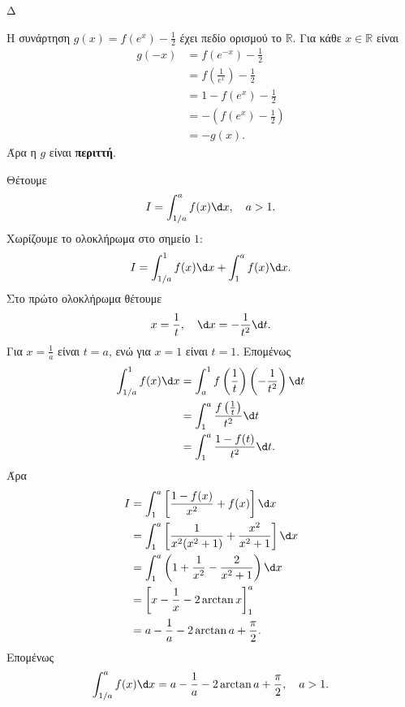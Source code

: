 \begin{thema}{Δ}
\begin{erwthma}
Η συνάρτηση $g(x)=f(e^x)-\frac{1}{2}$ έχει πεδίο ορισμού το $\mathbb{R}$. Για κάθε $x\in\mathbb{R}$ είναι
\begin{align*}
g(-x)
&=f(e^{-x})-\frac{1}{2}\\
&=f\left(\frac{1}{e^x}\right)-\frac{1}{2}\\
&=1-f(e^x)-\frac{1}{2}\\
&=-\left(f(e^x)-\frac{1}{2}\right)\\
&=-g(x).
\end{align*}
Άρα η $g$ είναι \textbf{περιττή}.

\item Θέτουμε
\[
I=\int_{1/a}^{a}f(x)\d x,\quad a>1.
\]
Χωρίζουμε το ολοκλήρωμα στο σημείο $1$:
\[
I=\int_{1/a}^{1}f(x)\d x+\int_1^a f(x)\d x.
\]
Στο πρώτο ολοκλήρωμα θέτουμε
\[
x=\frac{1}{t},
\quad
\d x=-\frac{1}{t^2}\d t.
\]
Για $x=\frac{1}{a}$ είναι $t=a$, ενώ για $x=1$ είναι $t=1$. Επομένως
\begin{align*}
\int_{1/a}^{1}f(x)\d x
&=\int_a^1 f\left(\frac{1}{t}\right)\left(-\frac{1}{t^2}\right)\d t\\
&=\int_1^a\frac{f\left(\frac{1}{t}\right)}{t^2}\d t\\
&=\int_1^a\frac{1-f(t)}{t^2}\d t.
\end{align*}
Άρα
\begin{align*}
I
&=\int_1^a\left[\frac{1-f(x)}{x^2}+f(x)\right]\d x\\
&=\int_1^a\left[\frac{1}{x^2(x^2+1)}+\frac{x^2}{x^2+1}\right]\d x\\
&=\int_1^a\left(1+\frac{1}{x^2}-\frac{2}{x^2+1}\right)\d x\\
&=\left[x-\frac{1}{x}-2\arctan x\right]_1^a\\
&=a-\frac{1}{a}-2\arctan a+\frac{\pi}{2}.
\end{align*}
Επομένως
\[
{\int_{1/a}^{a}f(x)\d x
=a-\frac{1}{a}-2\arctan a+\frac{\pi}{2}},
\quad a>1.
\]
\end{erwthma}
\end{thema}

